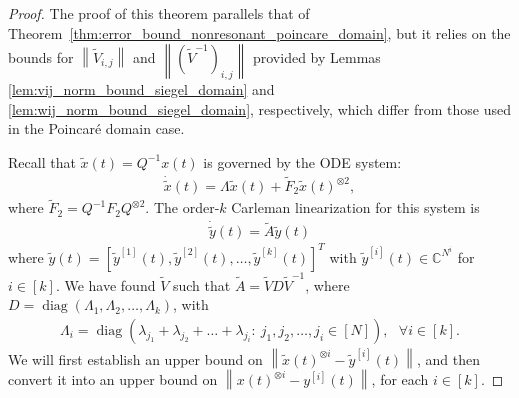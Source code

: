 \documentclass[superscriptaddress,onecolumn,nofootinbib,longbibliography,a4paper,accepted=2026-09-29]{quantumarticle}
\theoremstyle{plain}
\theoremstyle{definition}
\numberwithin{thm}{section}
\numberwithin{assumption}{section}
\numberwithin{lemma}{section}
\numberwithin{prop}{section}
\numberwithin{cor}{section}
\numberwithin{definition}{section}
\numberwithin{rmk}{section}
\numberwithin{equation}{section}
\newcommand{\norm}[1]     {\left\| #1 \right\|}
\newcommand{\myC}{\mathbb{C}}
\newcommand{\lrb}[1]{\left ( #1 \right )}
\newcommand{\diag}[1]{\operatorname{diag}\lrb{#1}}
\begin{document}
\begin{proof}
    The proof of this theorem parallels that of  Theorem~\ref{thm:error_bound_nonresonant_poincare_domain}, but it relies on the bounds for $\norm{\tilde{V}_{i,j}}$ and $\norm{\lrb{\tilde{V}^{-1}}_{i,j}}$ provided by Lemmas \ref{lem:vij_norm_bound_siegel_domain} and \ref{lem:wij_norm_bound_siegel_domain}, respectively, which differ from those used in the Poincar\'{e} domain case. 
    
    Recall that $\tilde{x}(t)=Q^{-1}x(t)$ is governed by the ODE system:
    \begin{align}
    \dot{\tilde{x}}(t)  = \Lambda \tilde{x}(t) + \tilde{F}_2 \tilde{x}(t)^{\otimes 2},   
    \end{align}
    where $\tilde{F}_2 = Q^{-1}F_2 Q^{\otimes 2}$. The order-$k$ Carleman linearization for this system is  
    \begin{align}
    \dot{\tilde{y}}(t) =\tilde{A}\tilde{y}(t)    
    \end{align}
     where $\tilde{y}(t)=[\tilde{y}^{[1]}(t), \tilde{y}^{[2]}(t),\dots,\tilde{y}^{[k]}(t)]^T$ with $\tilde{y}^{[i]}(t) \in \myC^{N^i}$ for $i \in [k]$. We have found $\tilde{V}$ such that $\tilde{A}=\tilde{V}D\tilde{V}^{-1}$, where $D=\diag{\Lambda_1, \Lambda_2, \dots, \Lambda_k}$, 
    with
    \begin{align}
    \Lambda_i=\diag{\lambda_{j_1}+\lambda_{j_2}+\dots+\lambda_{j_i}:~j_1,j_2,\dots,j_i \in [N]}, ~~~\forall i \in [k].
    \end{align}
    We will first establish an upper bound on $\norm{\tilde{x}(t)^{\otimes i}-\tilde{y}^{[i]}(t)}$, and then convert it into an upper bound on $\norm{x(t)^{\otimes i}-y^{[i]}(t)}$, for each $i \in [k]$.


\end{proof}
\end{document}
